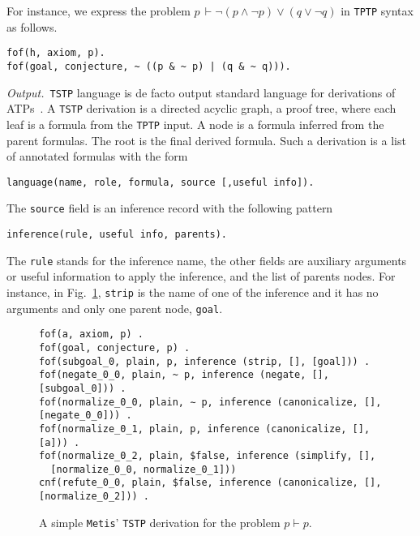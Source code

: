 \documentclass[../main.tex]{subfiles}
\begin{document}
For instance, we express the problem
$p\, \vdash \neg (p \wedge \neg p) \vee (q \vee \neg q)$
in \verb!TPTP! syntax as follows.

\begin{verbatim}
fof(h, axiom, p).
fof(goal, conjecture, ~ ((p & ~ p) | (q & ~ q))).
\end{verbatim}

\textit{Output.}~\verb!TSTP! language is de facto output standard language
for derivations of ATPs~\cite{sutcliffe2004tstp}.
A \verb!TSTP! derivation is a directed acyclic graph, a proof tree, where each leaf
is a formula from the \verb!TPTP! input. A node is a formula inferred from the parent
formulas. The root is the final derived formula. Such a derivation is a list of
annotated formulas with the form

\begin{verbatim}
language(name, role, formula, source [,useful info]).
\end{verbatim}

The \verb!source! field is an inference record with the following pattern
\begin{verbatim}
inference(rule, useful info, parents).
\end{verbatim}

The \verb!rule! stands for the inference name, the other fields are
auxiliary arguments or useful information to apply the inference, and
the list of parents nodes.
For instance, in Fig.~\ref{fig:metis-proof-tstp}, \verb!strip! is the name of one
of the inference and it has no arguments and only one parent node, \verb!goal!.

\begin{figure}
\begin{verbatim}
fof(a, axiom, p) .
fof(goal, conjecture, p) .
fof(subgoal_0, plain, p, inference (strip, [], [goal])) .
fof(negate_0_0, plain, ~ p, inference (negate, [], [subgoal_0])) .
fof(normalize_0_0, plain, ∼ p, inference (canonicalize, [], [negate_0_0])) .
fof(normalize_0_1, plain, p, inference (canonicalize, [], [a])) .
fof(normalize_0_2, plain, $false, inference (simplify, [],
  [normalize_0_0, normalize_0_1]))
cnf(refute_0_0, plain, $false, inference (canonicalize, [], [normalize_0_2])) .
\end{verbatim}
\caption{A simple \texttt{Metis}' \texttt{TSTP} derivation for the problem $p\vdash p$.}
\label{fig:metis-proof-tstp}
\end{figure}

\end{document}

